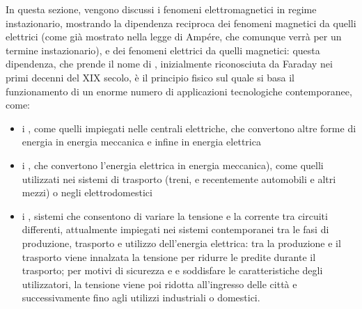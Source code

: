 \documentclass[letterpaper,10pt,italian]{jupyterBook}
\begin{document}
\sphinxAtStartPar
In questa sezione, vengono discussi i fenomeni elettromagnetici in regime instazionario, mostrando la dipendenza reciproca dei fenomeni magnetici da quelli elettrici (come già mostrato nella legge di Ampére, che comunque verrà {\hyperref[\detokenize{ch/electromagnetism/electromagnetism-general:physics-hs-electromagnetism-electromagnetism-general-ampere-maxwell}]{}} per un termine instazionario), e dei fenomeni elettrici da quelli magnetici: questa dipendenza, che prende il nome di {\hyperref[\detokenize{ch/electromagnetism/electromagnetism-general:physics-hs-electromagnetism-electromagnetism-general-em-induction}]{}}, inizialmente riconosciuta da Faraday nei primi decenni del XIX secolo, è il principio fisico sul quale si basa il funzionamento di un enorme numero di applicazioni tecnologiche contemporanee, come:
\begin{itemize}
\item {} 
\sphinxAtStartPar
i {\hyperref[\detokenize{ch/electromagnetism/electric-machines:physics-hs-electromagnetism-electric-machines-motor}]{}}, come quelli impiegati nelle centrali elettriche, che convertono altre forme di energia in energia meccanica e infine in energia elettrica

\item {} 
\sphinxAtStartPar
i {\hyperref[\detokenize{ch/electromagnetism/electric-machines:physics-hs-electromagnetism-electric-machines-motor}]{}}, che convertono l’energia elettrica in energia meccanica), come quelli utilizzati nei sistemi di trasporto (treni, e recentemente automobili e altri mezzi) o negli elettrodomestici

\item {} 
\sphinxAtStartPar
i {\hyperref[\detokenize{ch/electromagnetism/circuits-magnetic:physics-hs-electromagnetism-circuits-magnetic-transformer}]{}}, sistemi che consentono di variare la tensione e la corrente tra circuiti differenti, attualmente impiegati nei sistemi contemporanei tra le fasi di produzione, trasporto e utilizzo dell’energia elettrica: tra la produzione e il trasporto viene innalzata la tensione per ridurre le predite durante il trasporto; per motivi di sicurezza e e soddisfare le caratteristiche degli utilizzatori, la tensione viene poi ridotta all’ingresso delle città e successivamente fino agli utilizzi industriali o domestici.

\end{itemize}
\end{document}
